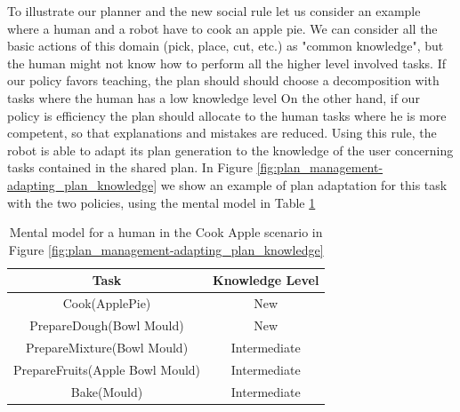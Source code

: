 To illustrate our planner and the new social rule let us consider an example where a human and a robot have to cook an apple pie. We can consider all the basic actions of this domain (pick, place, cut, etc.) as "common knowledge", but the human might not know how to perform all the higher level involved tasks. If our policy favors teaching, 
the plan should should choose a decomposition with tasks where the human has a low knowledge level  On the other hand, if our policy is efficiency the plan should allocate to the human tasks where he is more competent, so that explanations and mistakes are reduced. Using this rule, the robot is able to adapt its plan generation to the knowledge of the user concerning tasks contained in the shared plan. In Figure \ref{fig:plan_management-adapting_plan_knowledge} we show an example of plan adaptation for this task with the two policies, using the mental model in Table \ref{table:plan_management-apple_pie_human_knowledge}

 
 \begin{table}
\centering
\scriptsize
\renewcommand{\arraystretch}{1.3}
\begin{tabular}{|c|c|}
\hline
Task & Knowledge Level \\ \hline \hline
Cook(ApplePie) & New \\ \hline
PrepareDough(Bowl Mould) & New \\ \hline
PrepareMixture(Bowl Mould) & Intermediate \\ \hline
PrepareFruits(Apple Bowl Mould) & Intermediate \\ \hline
Bake(Mould) & Intermediate \\ 
\hline
\end{tabular}
\caption{Mental model for a human in the Cook Apple
 scenario in Figure \ref{fig:plan_management-adapting_plan_knowledge} }
 \label{table:plan_management-apple_pie_human_knowledge}    
\end{table}



